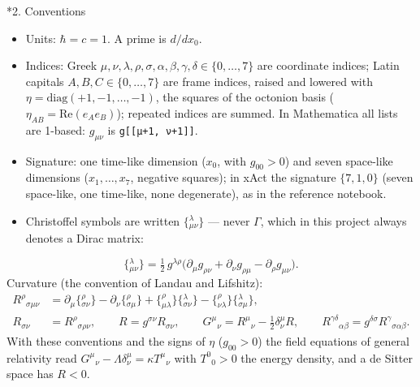 \documentclass[10pt,a4paper]{article}
\makeatletter
\renewcommand\section{\@startsection{section}{1}{\z@}{-3.5ex \@plus -1ex \@minus -.2ex}{2.3ex \@plus.2ex}{\normalfont\Large\bfseries\raggedright}}
\makeatother
\begin{document}
\section*{2. Conventions}
\begin{itemize}
\item Units: $\hbar=c=1$. A prime is $d/dx_0$.
\item Indices: Greek $\mu,\nu,\lambda,\rho,\sigma,\alpha,\beta,\gamma,\delta\in\lbrace0,\dots,7\rbrace$ are coordinate indices; Latin capitals $A,B,C\in\lbrace0,\dots,7\rbrace$ are frame indices, raised and lowered with $\eta=\mathrm{diag}(+1,-1,\dots,-1)$, the squares of the octonion basis ($\eta_{AB}=\mathrm{Re}(e_Ae_B)$); repeated indices are summed. In Mathematica all lists are 1-based: $g_{\mu\nu}$ is \texttt{g[[μ+1, ν+1]]}.
\item Signature: one time-like dimension ($x_0$, with $g_{00}>0$) and seven space-like dimensions ($x_1,\dots,x_7$, negative squares); in xAct the signature $\{7,1,0\}$ (seven space-like, one time-like, none degenerate), as in the reference notebook.
\item Christoffel symbols are written $\{{}^{\lambda}_{\mu\nu}\}$ — never $\Gamma$, which in this project always denotes a Dirac matrix:
\end{itemize}
\begin{equation*}
\{{}^{\lambda}_{\mu\nu}\}=\tfrac12\,g^{\lambda\rho}\big(\partial_\mu g_{\rho\nu}+\partial_\nu g_{\rho\mu}-\partial_\rho g_{\mu\nu}\big).
\end{equation*}
Curvature (the convention of Landau and Lifshitz):
\begin{align*}
R^{\rho}{}_{\sigma\mu\nu}&=\partial_\mu\{{}^{\rho}_{\sigma\nu}\}-\partial_\nu\{{}^{\rho}_{\sigma\mu}\}+\{{}^{\rho}_{\mu\lambda}\}\{{}^{\lambda}_{\sigma\nu}\}-\{{}^{\rho}_{\nu\lambda}\}\{{}^{\lambda}_{\sigma\mu}\}, \\
R_{\sigma\nu}&=R^{\rho}{}_{\sigma\rho\nu},\qquad R=g^{\sigma\nu}R_{\sigma\nu},\qquad G^{\mu}{}_{\nu}=R^{\mu}{}_{\nu}-\tfrac12\delta^\mu_\nu R,\qquad R^{\gamma\delta}{}_{\alpha\beta}=g^{\delta\sigma}R^{\gamma}{}_{\sigma\alpha\beta}.
\end{align*}
With these conventions and the signs of $\eta$ ($g_{00}>0$) the field equations of general relativity read $G^\mu{}_\nu-\Lambda\delta^\mu_\nu=\kappa T^\mu{}_\nu$ with $T^0{}_0>0$ the energy density, and a de Sitter space has $R<0$.
\end{document}
